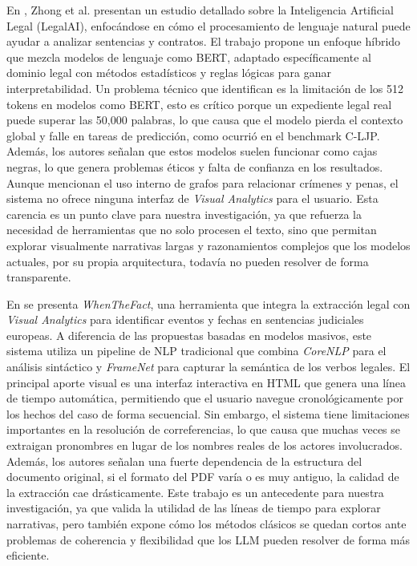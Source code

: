 En \cite{zhong-etal-2020-nlp}, Zhong et al. presentan un estudio detallado sobre la Inteligencia Artificial Legal (LegalAI), enfocándose en cómo el procesamiento de lenguaje natural puede ayudar a analizar sentencias y contratos. El trabajo propone un enfoque híbrido que mezcla modelos de lenguaje como \ac{BERT}, adaptado específicamente al dominio legal con métodos estadísticos y reglas lógicas para ganar interpretabilidad. Un problema técnico que identifican es la limitación de los 512 tokens en modelos como \acs{BERT}, esto es crítico porque un expediente legal real puede superar las 50,000 palabras, lo que causa que el modelo pierda el contexto global y falle en tareas de predicción, como ocurrió en el benchmark C-LJP. Además, los autores señalan que estos modelos suelen funcionar como cajas negras, lo que genera problemas éticos y falta de confianza en los resultados. Aunque mencionan el uso interno de grafos para relacionar crímenes y penas, el sistema no ofrece ninguna interfaz de \textit{Visual Analytics} para el usuario. Esta carencia es un punto clave para nuestra investigación, ya que refuerza la necesidad de herramientas que no solo procesen el texto, sino que permitan explorar visualmente narrativas largas y razonamientos complejos que los modelos actuales, por su propia arquitectura, todavía no pueden resolver de forma transparente.








En \cite{navas2022whenthefact} se presenta \textit{WhenTheFact}, una herramienta que integra la extracción legal con \textit{Visual Analytics} para identificar eventos y fechas en sentencias judiciales europeas. A diferencia de las propuestas basadas en modelos masivos, este sistema utiliza un pipeline de \ac{NLP} tradicional que combina \textit{CoreNLP} para el análisis sintáctico y \textit{FrameNet} para capturar la semántica de los verbos legales. El principal aporte visual es una interfaz interactiva en HTML que genera una línea de tiempo automática, permitiendo que el usuario navegue cronológicamente por los hechos del caso de forma secuencial. Sin embargo, el sistema tiene limitaciones importantes en la resolución de correferencias, lo que causa que muchas veces se extraigan pronombres en lugar de los nombres reales de los actores involucrados. Además, los autores señalan una fuerte dependencia de la estructura del documento original, si el formato del \ac{PDF} varía o es muy antiguo, la calidad de la extracción cae drásticamente. Este trabajo es un antecedente para nuestra investigación, ya que valida la utilidad de las líneas de tiempo para explorar narrativas, pero también expone cómo los métodos clásicos se quedan cortos ante problemas de coherencia y flexibilidad que los \acs{LLM} pueden resolver de forma más eficiente.












